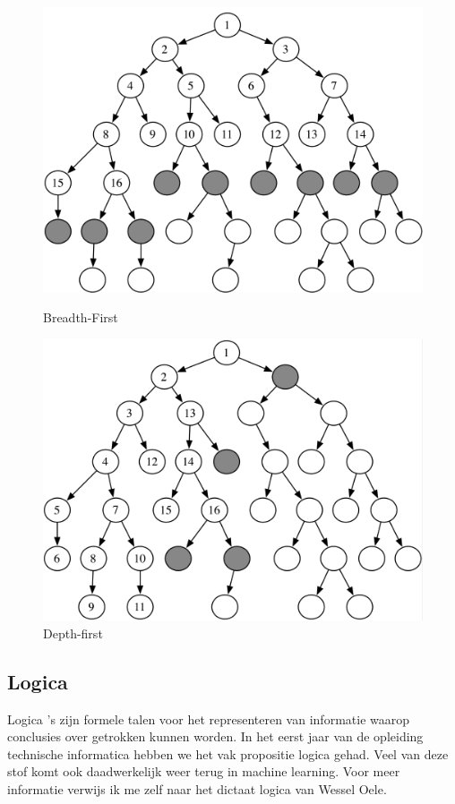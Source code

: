 \documentclass{article}
\begin{document}
\begin{figure}[h!]
\centering
\begin{minipage}{.45\linewidth}
  \includegraphics[width=\linewidth]{brd.png}
  \caption{Breadth-First}
  \label{Breadth-First}
\end{minipage}
\hspace{.05\linewidth}
\begin{minipage}{.45\linewidth}
  \includegraphics[width=\linewidth]{dept.png}
  \caption{Depth-first}
  \label{Depth-first}
\end{minipage}
\end{figure}

\subsection{Logica}
Logica 's zijn formele talen voor het representeren van informatie waarop conclusies over getrokken kunnen worden. In het eerst jaar van de opleiding technische informatica hebben we het vak propositie logica gehad. Veel van deze stof komt ook daadwerkelijk weer terug in machine learning. Voor meer informatie verwijs ik me zelf naar het dictaat logica van Wessel Oele\cite{logica}.
\end{document}
